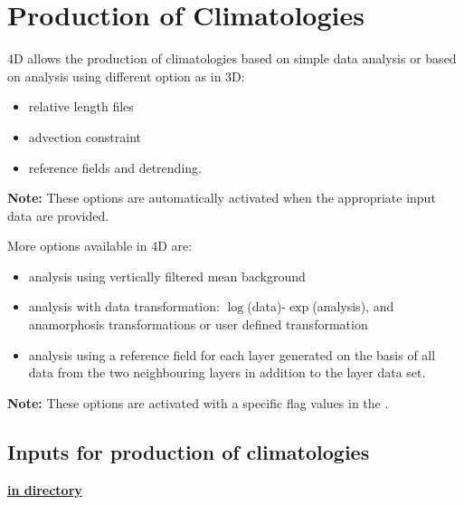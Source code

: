 
\section{Production of Climatologies}

\diva 4D allows the production of climatologies based on simple \diva data analysis or based on \diva analysis using different option as in \diva 3D:

\begin{itemize}
\item relative length files
\item advection constraint
\item reference fields and detrending.
\end{itemize}



\vspace{-0.5cm}


{\bf Note:} These options are automatically activated when the appropriate input data are provided.

More options available in \diva 4D are:

\begin{itemize}
\item analysis using vertically filtered mean background
\item analysis with data transformation:  $\log$(data)-$\exp$(analysis), and anamorphosis transformations or user defined transformation
\item analysis using  a reference field for each layer generated on the basis of all data from the two neighbouring layers in addition to the layer data set.
\end{itemize}


\vspace{-0.5cm}

{\bf Note:} These options are activated with a specific flag values in the .


\subsection{Inputs for production of climatologies}

\centerline{\underline{\bf{ in  directory}}}


